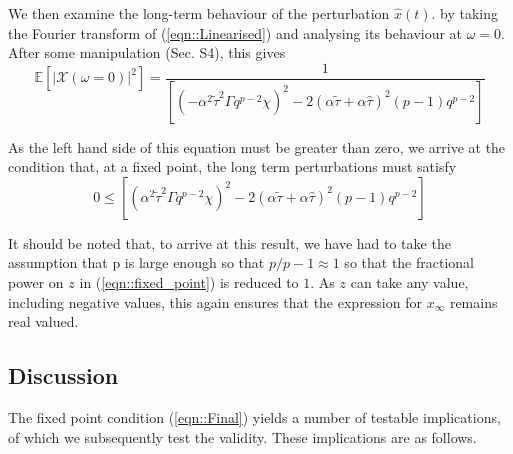 \documentclass[sigconf,anonymous]{aamas}
\newcommand{\ttau}{\tilde{\tau}}
\newcommand{\htau}{\hat{\tau}}
\newcommand{\xfixed}{x_\infty}
\newcommand{\xpert}{\hat{x}(t)}
\begin{document}
We then examine the
long-term behaviour of the perturbation $\xpert$. by taking
the Fourier transform of (\ref{eqn::Linearised}) and analysing its
behaviour at $\omega = 0$. After some manipulation (Sec. S4), this gives
%
\begin{equation}
        \mathbb{E}[|\mathcal{X}(\omega = 0)|^2] = \frac{1}{\left[ (-\alpha^2 \ttau^2 \Gamma q^{p-2} \chi)^2 - 2 (\alpha \ttau + \alpha \htau)^2 (p-1)q^{p-2}\right]} 
\end{equation}

As the left hand side of this equation must be greater than zero, we arrive at the condition that, at a fixed point, the long term perturbations must satisfy
%
\begin{equation}
    \label{eqn::Final}
    0 \leq \left [(\alpha^2 \ttau^2 \Gamma q^{p-2} \chi)^{2} - 2 (\alpha \ttau + \alpha \htau)^2 (p-1)q^{p-2} \right ]
\end{equation}

It should be noted that, to arrive at this result, we have had to take the assumption that p is large enough so that $p/p-1 \approx 1$ so that the fractional power on $z$ in (\ref{eqn::fixed_point}) is reduced to $1$. As $z$ can take any value, including negative values, this again ensures that the expression for $\xfixed$ remains real valued.

\subsection{Discussion}



The fixed point condition (\ref{eqn::Final}) yields a number of testable implications, of which we subsequently test the validity. These implications are as follows.
\end{document}

